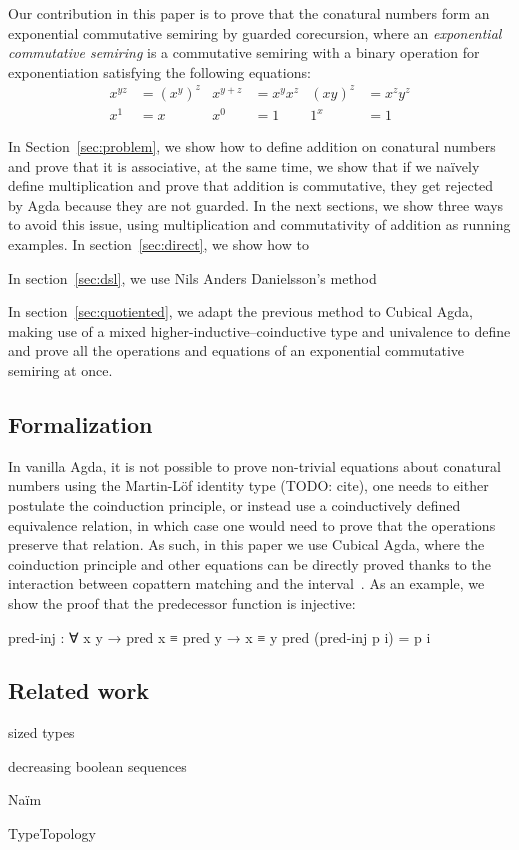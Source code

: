Our contribution in this paper is to prove that the conatural numbers form an
exponential commutative semiring by guarded corecursion, where an
\emph{exponential commutative semiring} is a commutative semiring with a binary
operation for exponentiation satisfying the following equations:
\begin{align*}
  x^{yz} &= (x^y)^z & x^{y+z} &= x^y x^z & (xy)^z &= x^z y^z \\
  x^1 &= x & x^0 &= 1 & 1^x &= 1
\end{align*}

In Section~\ref{sec:problem}, we show how to define addition on conatural
numbers and prove that it is associative, at the same time, we show that if we
naïvely define multiplication and prove that addition is commutative, they get
rejected by Agda because they are not guarded. In the next sections, we show
three ways to avoid this issue, using multiplication and commutativity of
addition as running examples. In section~\ref{sec:direct}, we show how to

In section~\ref{sec:dsl}, we use Nils Anders Danielsson's
method~\cite{danielsson-beating}

In section~\ref{sec:quotiented}, we adapt the previous method to Cubical Agda,
making use of a mixed higher-inductive--coinductive type and univalence to
define and prove all the operations and equations of an exponential commutative
semiring at once.

\subsection{Formalization}

In vanilla Agda, it is not possible to prove non-trivial equations about
conatural numbers using the Martin-Löf identity type (TODO: cite), one needs to
either postulate the coinduction principle, or instead use a coinductively
defined equivalence relation, in which case one would need to prove that the
operations preserve that relation. As such, in this paper we use Cubical Agda,
where the coinduction principle and other equations can be directly proved
thanks to the interaction between copattern matching and the
interval~\cite{vezzosi-cubical}. As an example, we show the proof that the
predecessor function is injective:
\begin{code}
pred-inj : ∀ {x y} → pred x ≡ pred y → x ≡ y
pred (pred-inj p i) = p i
\end{code}

\subsection{Related work}

sized types

decreasing boolean sequences

Naïm~\cite{favier-conat}

TypeTopology
